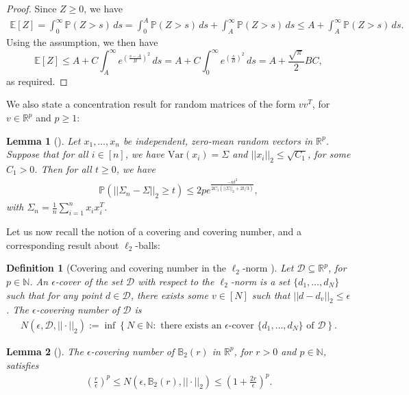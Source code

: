 \documentclass{article}
\newtheorem{lemma}{Lemma}
\newtheorem{definition}{Definition}[section]
\begin{document}
\begin{proof}
Since $Z \geq 0$, we have 
\begin{align*}
\mathbb{E}[Z] = \int_0^\infty\mathbb{P}(Z > s) \, ds = \int_0^A\mathbb{P}(Z > s) \, ds + \int_A^\infty \mathbb{P}(Z > s) \, ds \leq A + \int_A^\infty \mathbb{P}(Z > s) \, ds.
\end{align*}
Using the assumption, we then have
\begin{equation*}
\mathbb{E}[Z] \leq A + C\int_A^\infty e^{\left(\frac{s - A}{B}\right)^2}\, ds = A + C\int_0^\infty e^{\left(\frac{s}{B}\right)^2}\, ds
= A + \frac{\sqrt{\pi}}{2}BC,
\end{equation*}
as required.
\end{proof}

We also state a concentration result for random matrices of the form $vv^T$, for $v \in \mathbb{R}^p$ and $p \geq 1$:

\begin{lemma}[\cite{Prob_Stats_Chen}]
\label{lemma:Concxx^T}
Let $x_1, \dots, x_n$ be independent, zero-mean random vectors in $\mathbb{R}^p$. Suppose that for all $i \in [n]$, we have $\mathrm{Var}(x_i) = \Sigma$ and $||x_i||_2 \leq \sqrt{C_1}$, for some $C_1 > 0$. Then for all $t \geq 0$, we have
\begin{align*}
\mathbb{P}\left(||\Sigma_n - \Sigma||_2 \geq t\right) \le 2pe^{\frac{-nt^2}{2C_1(||\Sigma||_2 + 2t/3)}},
\end{align*}
with $\Sigma_n = \frac{1}{n}\sum_{i = 1}^n x_ix_i^T$.
\end{lemma}

Let us now recall the notion of a covering and covering number, and a corresponding result about $\ell_2$-balls:

\begin{definition}[Covering and covering number in the $\ell_2$-norm \cite{Stats_Info_Duchi}]
Let $\mathcal{D} \subseteq \mathbb{R}^p$, for $p \in \mathbb{N}$. An \emph{$\epsilon$-cover} of the set $\mathcal{D}$ with respect to the $\ell_2$-norm is a set $\{d_1, \dots, d_N\}$ such that for any point $d \in \mathcal{D}$, there exists some $v \in [N]$ such that $||d - d_v||_2 \leq \epsilon$. The \emph{$\epsilon$-covering number} of $\mathcal{D}$ is
\begin{align*}
N(\epsilon, \mathcal{D}, ||\cdot||_2) := \inf\left\{N \in \mathbb{N}: \text{ there exists an } \epsilon\text{-cover  } \{d_1, \dots, d_N\} \text{ of } \mathcal{D}\right\}.
\end{align*}
\end{definition}
\begin{lemma}[\cite{Stats_Info_Duchi}]
\label{lemma:Covering_Nr_Ball}
The $\epsilon$-covering number of $\mathbb{B}_2(r)$ in $\mathbb{R}^p$, for $r > 0$ and $p \in \mathbb{N}$, satisfies
\begin{align*}
\left(\frac{r}{\epsilon}\right)^p \leq N(\epsilon, \mathbb{B}_2(r), ||\cdot||_2) \leq \left(1 + \frac{2r}{\epsilon}\right)^p.
\end{align*}
\end{lemma}
\end{document}
